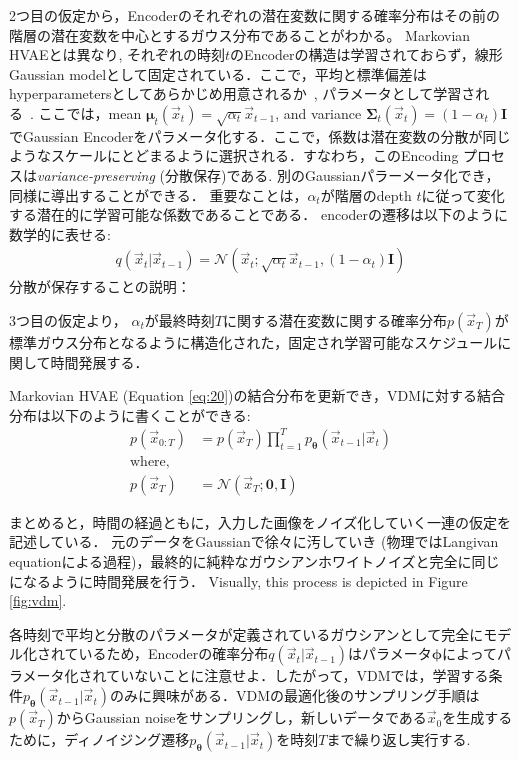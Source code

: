 2つ目の仮定から，Encoderのそれぞれの潜在変数に関する確率分布はその前の階層の潜在変数を中心とするガウス分布であることがわかる。
Markovian HVAEとは異なり, それぞれの時刻$t$のEncoderの構造は学習されておらず，線形Gaussian modelとして固定されている．ここで，平均と標準偏差はhyperparametersとしてあらかじめ用意されるか~\cite{ho2020denoising}, パラメータとして学習される~\cite{kingma2021variational}.  ここでは，mean $\bm{\mu}_t(\vec{x}_t) = \sqrt{\alpha_t} \vec{x}_{t-1}$, and variance $\bm{\Sigma}_t(\vec{x}_t) = (1 - \alpha_t) \textbf{I}$でGaussian Encoderをパラメータ化する．ここで，係数は潜在変数の分散が同じようなスケールにとどまるように選択される．すなわち，このEncoding プロセスは\textit{variance-preserving} (分散保存)である. 別のGaussianパラーメータ化でき，同様に導出することができる． 重要なことは，$\alpha_t$が階層のdepth $t$に従って変化する潜在的に学習可能な係数であることである．
encoderの遷移は以下のように数学的に表せる:
\begin{align}
    q(\vec{x}_{t}|\vec{x}_{t-1}) = \mathcal{N}(\vec{x}_{t} ; \sqrt{\alpha_t} \vec{x}_{t-1}, (1 - \alpha_t) \textbf{I}) \label{eq:27}
\end{align}
分散が保存することの説明：


3つ目の仮定より， $\alpha_t$が最終時刻$T$に関する潜在変数に関する確率分布$p(\vec{x}_T)$が標準ガウス分布となるように構造化された，固定され学習可能なスケジュールに関して時間発展する．

Markovian HVAE (Equation \ref{eq:20})の結合分布を更新でき，VDMに対する結合分布は以下のように書くことができる: 
\begin{align}
p(\vec{x}_{0:T}) &= p(\vec{x}_T)\prod_{t=1}^{T}p_{\bm{\theta}}(\vec{x}_{t-1}|\vec{x}_t) \label{eq:36} \\
\text{where,}&\nonumber\\
p(\vec{x}_T) &= \mathcal{N}(\vec{x}_T; \bm{0}, \textbf{I})
\end{align}

まとめると，時間の経過ともに，入力した画像をノイズ化していく一連の仮定を記述している．
元のデータをGaussianで徐々に汚していき (物理ではLangivan equationによる過程)，最終的に純粋なガウシアンホワイトノイズと完全に同じになるように時間発展を行う．
 Visually, this process is depicted in Figure \ref{fig:vdm}.

各時刻で平均と分散のパラメータが定義されているガウシアンとして完全にモデル化されているため，Encoderの確率分布$q(\vec{x}_t|\vec{x}_{t-1})$はパラメータ$\bm{\phi}$によってパラメータ化されていないことに注意せよ．したがって，VDMでは，学習する条件$p_{\bm{\theta}}(\vec{x}_{t-1}|\vec{x}_{t})$のみに興味がある．VDMの最適化後のサンプリング手順は $p(\vec{x}_T)$からGaussian noiseをサンプリングし，新しいデータである$\vec{x}_0$を生成するために，ディノイジング遷移$p_{\bm{\theta}}(\vec{x}_{t-1}|\vec{x}_{t})$を時刻$T$まで繰り返し実行する.

